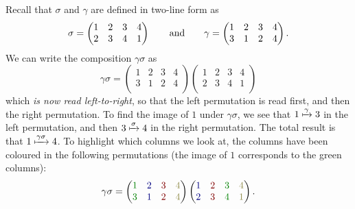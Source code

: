 \begin{example}
     Recall that $\sigma$ and $\gamma$ are defined in two-line form as
    \[
    \sigma = \begin{pmatrix}
        1 & 2 & 3 & 4 \\
        2 & 3 & 4 & 1 \\
    \end{pmatrix} \hspace{20pt}\text{and}\hspace{20pt} \gamma = \begin{pmatrix}
        1 & 2 & 3 & 4 \\
        3 & 1 & 2 & 4 \\
    \end{pmatrix}.
    \]
    We can write the composition $\gamma\sigma$ as
    \[
    \gamma\sigma = \begin{pmatrix}
        1 & 2 & 3 & 4 \\
        3 & 1 & 2 & 4 \\
    \end{pmatrix}\begin{pmatrix}
        1 & 2 & 3 & 4 \\
        2 & 3 & 4 & 1 \\
    \end{pmatrix}
    \]
    which \textit{is now read left-to-right}, so that the left permutation is read first, and then the right permutation. To find the image of $1$ under $\gamma\sigma$, we see that $1 \xmapsto{\gamma} 3$ in the left permutation, and then $3 \xmapsto{\sigma} 4$ in the right permutation. The total result is that $1 \xmapsto{\gamma\sigma} 4$. To highlight which columns we look at, the columns have been coloured in the following permutations (the image of $1$ corresponds to the green columns):
    \[
    \gamma\sigma = \begin{pmatrix}
        \textcolor{green!50!black}{1} & \textcolor{blue!50!black}{2} & \textcolor{red!50!black}{3} & \textcolor{yellow!50!black}{4} \\
        \textcolor{green!50!black}{3} & \textcolor{blue!50!black}{1} & \textcolor{red!50!black}{2} & \textcolor{yellow!50!black}{4} \\
    \end{pmatrix}\begin{pmatrix}
        \textcolor{blue!50!black}{1} & \textcolor{red!50!black}{2} & \textcolor{green!50!black}{3} & \textcolor{yellow!50!black}{4} \\
        \textcolor{blue!50!black}{2} & \textcolor{red!50!black}{3} & \textcolor{green!50!black}{4} & \textcolor{yellow!50!black}{1} \\
    \end{pmatrix}.
\]
\end{example}
